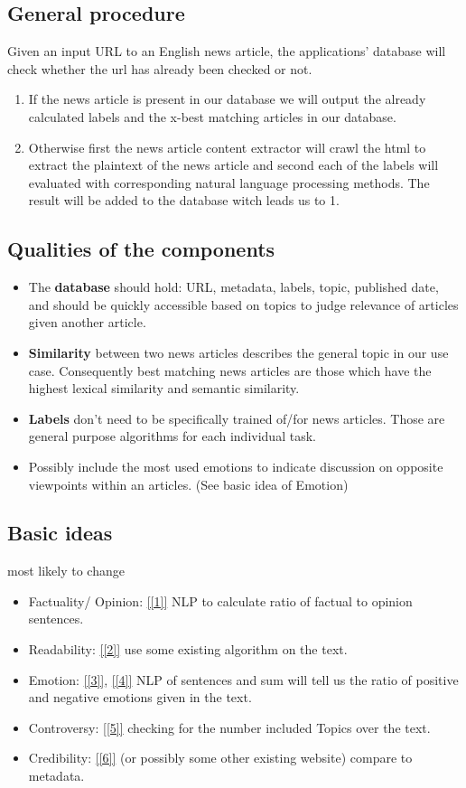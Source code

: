 \documentclass[10pt]{article}
\begin{document}
\begin{multicols}{2}
\subsection{General procedure}
Given an input URL to an English news article, the applications' database will check whether the url has already been checked or not.
\begin{enumerate}
\item If the news article is present in our database we will output the already calculated labels and the x-best matching articles in our database.
\item Otherwise first the news article content extractor will crawl the html to extract the plaintext of the news article and second each of the labels will evaluated with corresponding natural language processing methods. The result will be added to the database witch leads us to 1.
\end{enumerate}

\subsection{Qualities of the components}
\begin{itemize}
\item The \textbf{database} should hold: URL, metadata, labels, topic, published date, and should be quickly accessible based on topics to judge relevance of articles given another article.
\item \textbf{Similarity} between two news articles describes the general topic in our use case. Consequently best matching news articles are those which have the highest lexical similarity and semantic similarity.
\item \textbf{Labels} don't need to be specifically trained of/for news articles. Those are general purpose algorithms for each individual task.
\item Possibly include the most used emotions to indicate discussion on opposite viewpoints within an articles. (See basic idea of Emotion)
\end{itemize}

\subsection{Basic ideas}
most likely to change
\begin{itemize}
\item Factuality/ Opinion: \ref{[1]} NLP to calculate ratio of factual to opinion sentences.
\item Readability:  \ref{[2]} use some existing algorithm on the text.
\item Emotion: \ref{[3]}, \ref{[4]} NLP of sentences and sum will tell us the ratio of positive and negative emotions given in the text.
\item Controversy: \ref{[5]} checking for the number included Topics over the text.
\item Credibility: \ref{[6]} (or possibly some other existing website) compare to metadata.
\end{itemize}



\end{multicols}
\end{document}

